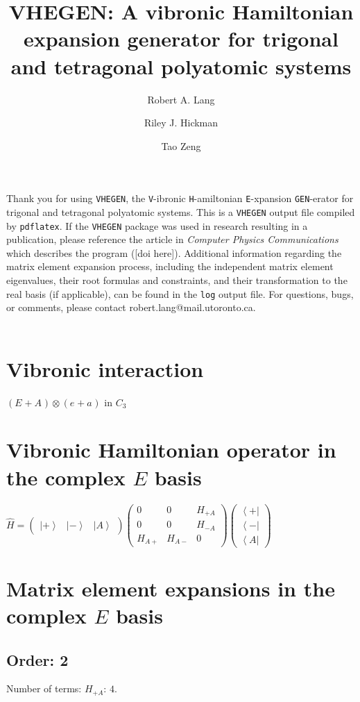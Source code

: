 \documentclass[fleqn]{article}
\title{VHEGEN: A vibronic Hamiltonian expansion generator for trigonal and tetragonal polyatomic systems}
\author{Robert A. Lang \and Riley J. Hickman \and Tao Zeng}
\date{}
\begin{document}
\maketitle
Thank you for using \texttt{VHEGEN}, the \texttt{V}-ibronic \texttt{H}-amiltonian \texttt{E}-xpansion \texttt{GEN}-erator for trigonal and tetragonal polyatomic systems. This is a \texttt{VHEGEN} output file compiled by \texttt{pdflatex}. If the \texttt{VHEGEN} package was used in research resulting in a publication, please reference the article in \textit{Computer Physics Communications} which describes the program ([doi here]). Additional information regarding the matrix element expansion process, including the independent matrix element eigenvalues, their root formulas and constraints, and their transformation to the real basis (if applicable), can be found in the \texttt{log} output file. For questions, bugs, or comments, please contact robert.lang@mail.utoronto.ca.\\\\
\tableofcontents
\newpage
\section{Vibronic interaction}
$(E_{}+A_{}) \otimes (e_{}+a_{})$ in $C_{3}$
\section{Vibronic Hamiltonian operator in the complex $E$ basis}
$\hat{H}=\left(\begin{matrix}{\left|+\right\rangle } & {\left|-\right\rangle } & {\left|A\right\rangle }\end{matrix}\right) \left(\begin{matrix}0 & 0 & H_{+A}\\0 & 0 & H_{-A}\\H_{A+} & H_{A-} & 0\end{matrix}\right) \left(\begin{matrix}{\left\langle +\right|}\\{\left\langle -\right|}\\{\left\langle A\right|}\end{matrix}\right)$
\section{Matrix element expansions in the complex $E$ basis}
\subsection{Order: 2}
Number of terms: $H_{+A}$: $4$.
\end{document}

